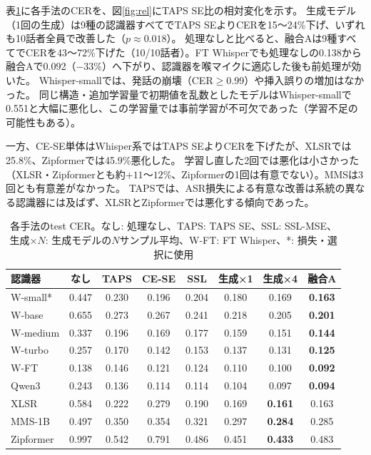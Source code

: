 \documentclass[xelatex,ja=standard,a4paper,twocolumn,10pt]{bxjsarticle}
\makeatletter
\renewcommand{\subsection}{\@startsection{subsection}{2}{\z@}{.7ex plus .2ex}{.3ex}{\normalfont\normalsize\sffamily\bfseries}}
\makeatother
\begin{document}
\subsection{生成モデルの効果}
表\ref{tab:main}に各手法のCERを、図\ref{fig:rel}にTAPS SE比の相対変化を示す。
生成モデル（1回の生成）は9種の認識器すべてでTAPS SEよりCERを15〜24\%下げ、いずれも10話者全員で改善した（$p\approx0.018$）。
処理なしと比べると、融合Aは9種すべてでCERを43〜72\%下げた（10/10話者）。FT Whisperでも処理なしの0.138から融合Aで0.092（$-33$\%）へ下がり、認識器を喉マイクに適応した後も前処理が効いた。
Whisper-smallでは、発話の崩壊（CER$\geq$0.99）や挿入誤りの増加はなかった。
同じ構造・追加学習量で初期値を乱数としたモデルはWhisper-smallで0.551と大幅に悪化し、この学習量では事前学習が不可欠であった（学習不足の可能性もある）。

一方、CE-SE単体はWhisper系ではTAPS SEよりCERを下げたが、XLSRでは25.8\%、Zipformerでは45.9\%悪化した。
学習し直した2回では悪化は小さかった（XLSR・Zipformerとも約$+11$〜$12$\%、Zipformerの1回は有意でない）。MMSは3回とも有意差がなかった。
TAPSでは、ASR損失による有意な改善は系統の異なる認識器には及ばず、XLSRとZipformerでは悪化する傾向であった。

\begin{table}[t]
  \centering
  \caption{各手法のtest CER。なし: 処理なし、TAPS: TAPS SE、SSL: SSL-MSE、生成×$N$: 生成モデルの$N$サンプル平均、W-FT: FT Whisper、*: 損失・選択に使用}
  \label{tab:main}
  \footnotesize
  \setlength{\tabcolsep}{1.2pt}
  \begin{tabular}{lccccccc}
    \toprule
    認識器 & なし & TAPS & CE-SE & SSL & 生成×1 & 生成×4 & 融合A \\
    \midrule
    W-small* & 0.447 & 0.230 & 0.196 & 0.204 & 0.180 & 0.169 & \textbf{0.163} \\
    W-base & 0.655 & 0.273 & 0.267 & 0.241 & 0.218 & 0.205 & \textbf{0.201} \\
    W-medium & 0.337 & 0.196 & 0.169 & 0.177 & 0.159 & 0.151 & \textbf{0.144} \\
    W-turbo & 0.257 & 0.170 & 0.142 & 0.153 & 0.137 & 0.131 & \textbf{0.125} \\
    W-FT & 0.138 & 0.146 & 0.121 & 0.124 & 0.110 & 0.100 & \textbf{0.092} \\
    Qwen3 & 0.243 & 0.136 & 0.114 & 0.114 & 0.104 & 0.097 & \textbf{0.094} \\
    \midrule
    XLSR & 0.584 & 0.222 & 0.279 & 0.190 & 0.169 & \textbf{0.161} & 0.163 \\
    MMS-1B & 0.497 & 0.350 & 0.354 & 0.321 & 0.297 & \textbf{0.284} & 0.285 \\
    Zipformer & 0.997 & 0.542 & 0.791 & 0.486 & 0.451 & \textbf{0.433} & 0.483 \\
    \bottomrule
  \end{tabular}
\end{table}
\end{document}
